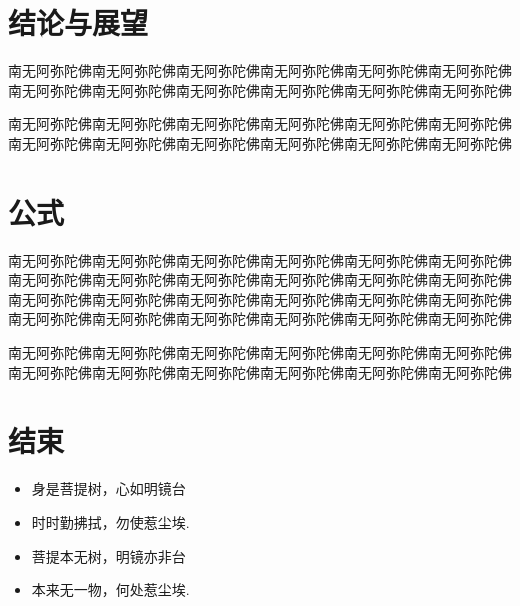 \documentclass[UTF8,a4paper,10pt]{article}
\begin{document}

\section{结论与展望}
南无阿弥陀佛南无阿弥陀佛南无阿弥陀佛南无阿弥陀佛南无阿弥陀佛南无阿弥陀佛南无阿弥陀佛南无阿弥陀佛南无阿弥陀佛南无阿弥陀佛南无阿弥陀佛南无阿弥陀佛
\par

\noindent 南无阿弥陀佛南无阿弥陀佛南无阿弥陀佛南无阿弥陀佛南无阿弥陀佛南无阿弥陀佛南无阿弥陀佛南无阿弥陀佛南无阿弥陀佛南无阿弥陀佛南无阿弥陀佛南无阿弥陀佛
\section{公式}
南无阿弥陀佛南无阿弥陀佛南无阿弥陀佛南无阿弥陀佛南无阿弥陀佛南无阿弥陀佛南无阿弥陀佛南无阿弥陀佛南无阿弥陀佛南无阿弥陀佛南无阿弥陀佛南无阿弥陀佛南无阿弥陀佛南无阿弥陀佛南无阿弥陀佛南无阿弥陀佛南无阿弥陀佛南无阿弥陀佛南无阿弥陀佛南无阿弥陀佛南无阿弥陀佛南无阿弥陀佛南无阿弥陀佛南无阿弥陀佛
\noindent

\par\noindent
南无阿弥陀佛南无阿弥陀佛南无阿弥陀佛南无阿弥陀佛南无阿弥陀佛南无阿弥陀佛南无阿弥陀佛南无阿弥陀佛南无阿弥陀佛南无阿弥陀佛南无阿弥陀佛南无阿弥陀佛
\section{结束}


\begin{itemize}
    \item 身是菩提树，心如明镜台
    \item 时时勤拂拭，勿使惹尘埃.
    \item 菩提本无树，明镜亦非台
    \item 本来无一物，何处惹尘埃.
\end{itemize}
\end{document}

